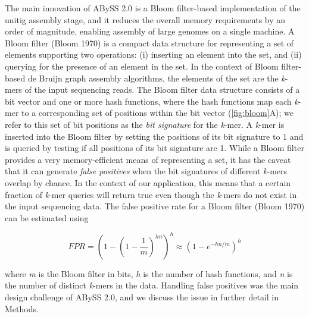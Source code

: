 \documentclass[
  12pt,
  oneside,
  openany]{book}
\begin{document}
The main innovation of ABySS 2.0 is a Bloom filter-based implementation of the unitig assembly stage, and it reduces the overall memory requirements by an order of magnitude, enabling assembly of large genomes on a single machine. A Bloom filter (Bloom 1970) is a compact data structure for representing a set of elements supporting two operations: (i) inserting an element into the set, and (ii) querying for the presence of an element in the set. In the context of Bloom filter-based de Bruijn graph assembly algorithms, the elements of the set are the \emph{k}-mers of the input sequencing reads. The Bloom filter data structure consists of a bit vector and one or more hash functions, where the hash functions map each \emph{k}-mer to a corresponding set of positions within the bit vector (\cref{fig:bloom}A); we refer to this set of bit positions as the \emph{bit signature} for the \emph{k}-mer. A \emph{k}-mer is inserted into the Bloom filter by setting the positions of its bit signature to 1 and is queried by testing if all positions of its bit signature are 1. While a Bloom filter provides a very memory-efficient means of representing a set, it has the caveat that it can generate \emph{false positives} when the bit signatures of different \emph{k}-mers overlap by chance. In the context of our application, this means that a certain fraction of \emph{k}-mer queries will return true even though the \emph{k}-mers do not exist in the input sequencing data. The false positive rate for a Bloom filter (Bloom 1970) can be estimated using

\begin{equation} FPR = \left(1 - \left(1 - \frac{1}{m}\right)^{hn}\right)^h \approx \left(1 - e^{-hn/m}\right)^h \label{eq:fpr}\end{equation}

where \emph{m} is the Bloom filter in bits, \emph{h} is the number of hash functions, and \emph{n} is the number of distinct \emph{k}-mers in the data. Handling false positives was the main design challenge of ABySS 2.0, and we discuss the issue in further detail in Methods.
\end{document}
